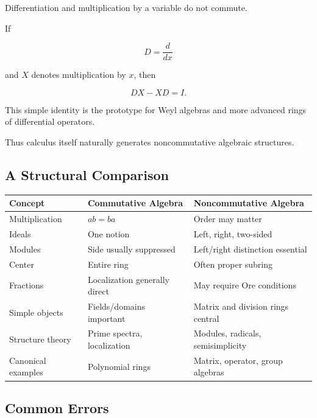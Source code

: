 Differentiation and multiplication by a variable do not commute.

If

\[ D=\frac{d}{dx} \]

and \(X\) denotes multiplication by \(x\), then

\[ DX-XD=I. \]

This simple identity is the prototype for Weyl algebras and more advanced
rings of differential operators.

Thus calculus itself naturally generates noncommutative algebraic
structures.

\subsection{A Structural Comparison}
\label{subsec:commutative-noncommutative-comparison}

\begin{center}
\begin{tabularx}{0.95\textwidth}{@{}XXX@{}}
\toprule
\textbf{Concept} & \textbf{Commutative Algebra} & \textbf{Noncommutative Algebra}\\
\midrule
Multiplication & \(ab=ba\) & Order may matter\\
Ideals & One notion & Left, right, two-sided\\
Modules & Side usually suppressed & Left/right distinction essential\\
Center & Entire ring & Often proper subring\\
Fractions & Localization generally direct & May require Ore conditions\\
Simple objects & Fields/domains important & Matrix and division rings central\\
Structure theory & Prime spectra, localization & Modules, radicals, semisimplicity\\
Canonical examples & Polynomial rings & Matrix, operator, group algebras\\
\bottomrule
\end{tabularx}
\end{center}

\subsection{Common Errors}
\label{subsec:noncommutative-common-errors}

